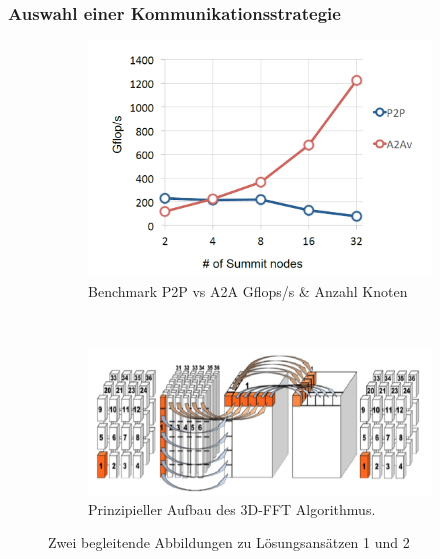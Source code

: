 \subsubsection{Auswahl einer Kommunikationsstrategie}
\begin{figure}
	\begin{subfigure}[t]{0.5\textwidth}
		\centering
		\includegraphics[width=1\textwidth]{res/bench.png}
		\caption{\cite[Abb. 5]{mainpaper} Benchmark P2P vs A2A Gflops/s \& Anzahl Knoten}
		\label{fig:bench}
	\end{subfigure}
~
	\begin{subfigure}[t]{0.5\textwidth}
		\centering
		\includegraphics[width=1\textwidth]{res/algo.png}
		\caption{\cite[Abb. 2]{mainpaper} Prinzipieller Aufbau des 3D-FFT Algorithmus. }
		\label{fig:algo}
	\end{subfigure}
	\caption{Zwei begleitende Abbildungen zu Lösungsansätzen 1 und 2}
\end{figure}

